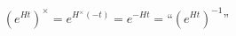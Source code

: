 \begin{equation}
\left( e^{Ht} \right)^\times = e^{H^\times (-t)} = e^{-Ht}
	= \textrm{``}\left( e^{Ht}\right)^{-1}\textrm{''}
\label{eq:realmod}
\end{equation}

